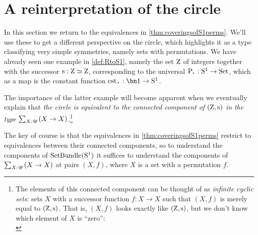 \section{A reinterpretation of the circle}\label{sec:S1isC}

In this section we return to the equivalences in \cref{thm:coveringsofS1perms}.
We'll use these to get a different perspective on the circle,
which highlights it as a type classifying very simple symmetries,
namely sets with permutations.
We have already seen one example in \cref{def:RtoS1},
namely the set $\mathrm{Z}$ of integers together with the successor $\zs: \zet\equiv\zet$,
corresponding to the universal \covering $\uc\base:\Sc \to \Set$,
which as a map is the constant function $\cst\base : \bn 1 \to \Sc$.

The importance of the latter example will become apparent when we eventually
explain that \emph{the circle is equivalent to the connected component of
  $(\zet,\zs)$ in the type $\sum_{X:{\mathscr{U}}}(X\to X)$}.\footnote{%
  The elements of this connected component can be thought of as
  \emph{infinite cyclic sets}:
  sets $X$ with a successor function $f:X \to X$
  such that $(X,f)$ is merely equal to $(\zet,\zs)$.
  That is, $(X,f)$ looks exactly like $(\zet,\zs)$,
  but we don't know which element of $X$ is ``zero'':\\[1ex]
  }

The key of course is that the equivalences in \cref{thm:coveringsofS1perms}
restrict to equivalences between their connected components,
so to understand the components of $\mathrm{SetBundle}({\mathrm{S}^1})$
it suffices to understand the components of $\sum_{X:{\mathscr{U}}}(X \to X)$ at pairs $(X,f)$,
where $X$ is a set with a permutation $f$.


